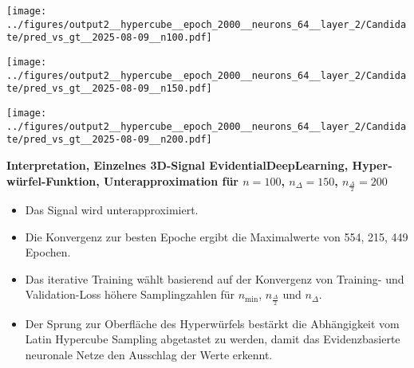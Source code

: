 \begin{otherlanguage}{ngerman}
\begin{samepage}
\begin{minipage}{\textwidth}
\vspace{0.125cm}

\begin{minipage}{0.05\textwidth}
    \centering{}
\end{minipage}%
\begin{minipage}{0.3\textwidth}
    \centering
    \texttt{[image: ../figures/output2\_\_hypercube\_\_epoch\_2000\_\_neurons\_64\_\_layer\_2/Candidate/pred\_vs\_gt\_\_2025-08-09\_\_n100.pdf]}
\end{minipage}%
\begin{minipage}{0.3\textwidth}
    \centering
    \texttt{[image: ../figures/output2\_\_hypercube\_\_epoch\_2000\_\_neurons\_64\_\_layer\_2/Candidate/pred\_vs\_gt\_\_2025-08-09\_\_n150.pdf]}
\end{minipage}%
\begin{minipage}{0.3\textwidth}
    \centering
    \texttt{[image: ../figures/output2\_\_hypercube\_\_epoch\_2000\_\_neurons\_64\_\_layer\_2/Candidate/pred\_vs\_gt\_\_2025-08-09\_\_n200.pdf]}
\end{minipage}

\label{fig:pred_vs_gt_matrix}

\end{minipage}
\end{samepage}



\clearpage

\begin{samepage}
\begin{minipage}{\textwidth}

\noindent\textbf{Interpretation, Einzelnes 3D-Signal \gls{EvidentialDeepLearning}, Hyperwürfel-Funktion,
Unterapproximation für $n=100$, $n_{\Delta}=150$, $n_{\frac{\Delta}{2}}=200$}

\begin{itemize}
    \item Das Signal wird unterapproximiert.
    \item Die Konvergenz zur besten Epoche ergibt die Maximalwerte von 554, 215, 449 Epochen.
    \item Das iterative Training wählt basierend auf der Konvergenz von Training- und Validation-Loss höhere Samplingzahlen für $n_{\min}$, $n_{\frac{\Delta}{2}}$ und $n_{\Delta}$.
    \item Der Sprung zur Oberfläche des Hyperwürfels bestärkt die Abhängigkeit vom Latin Hypercube Sampling abgetastet zu werden, damit das \gls{Evidenzbasierte neuronale Netze} den Ausschlag der Werte erkennt. 
\end{itemize}





\end{minipage}
\end{samepage}
\end{otherlanguage}
